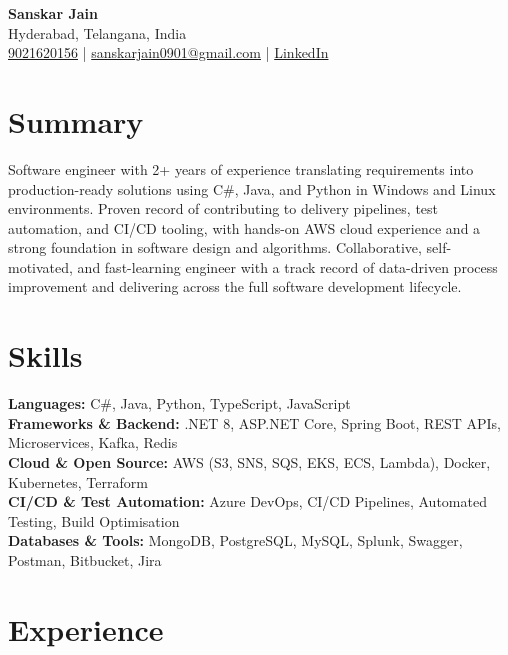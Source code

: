 \documentclass[letterpaper,10pt]{article}
\begin{document}
\begin{center}
    {\LARGE \textbf{Sanskar Jain}} \\
    Hyderabad, Telangana, India \\
    \href{tel:9021620156}{9021620156} \;|\;
    \href{mailto:sanskarjain0901@gmail.com}{sanskarjain0901@gmail.com} \;|\;
    \href{https://www.linkedin.com/in/sanskar-jain0901/}{LinkedIn}
\end{center}

\vspace{3pt}

\section*{Summary}
Software engineer with 2+ years of experience translating requirements into production-ready solutions using C\#, Java, and Python in Windows and Linux environments.
Proven record of contributing to delivery pipelines, test automation, and CI/CD tooling, with hands-on AWS cloud experience and a strong foundation in software design and algorithms.
Collaborative, self-motivated, and fast-learning engineer with a track record of data-driven process improvement and delivering across the full software development lifecycle.

\section*{Skills}
\textbf{Languages:} C\#, Java, Python, TypeScript, JavaScript \\
\textbf{Frameworks \& Backend:} .NET 8, ASP.NET Core, Spring Boot, REST APIs, Microservices, Kafka, Redis \\
\textbf{Cloud \& Open Source:} AWS (S3, SNS, SQS, EKS, ECS, Lambda), Docker, Kubernetes, Terraform \\
\textbf{CI/CD \& Test Automation:} Azure DevOps, CI/CD Pipelines, Automated Testing, Build Optimisation \\
\textbf{Databases \& Tools:} MongoDB, PostgreSQL, MySQL, Splunk, Swagger, Postman, Bitbucket, Jira

\section*{Experience}
\end{document}
